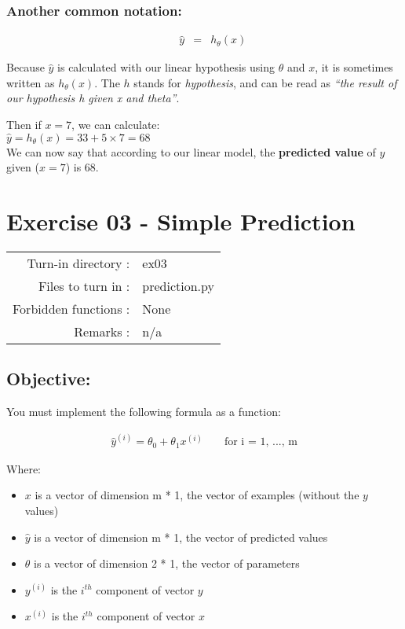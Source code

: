 \documentclass[]{article}
\begin{document}
\hypertarget{another-common-notation}{%
\subsubsection{Another common notation:}\label{another-common-notation}}

\large

\[
\begin{matrix} & & \hat{y} & = & h_{\theta}(x)\end{matrix}
\] \normalsize

Because \(\hat{y}\) is calculated with our linear hypothesis using
\(\theta\) and \(x\), it is sometimes written as \(h_{\theta}(x)\). The
\(h\) stands for \emph{hypothesis}, and can be read as \emph{``the
result of our hypothesis h given x and theta''}.

Then if \(x = 7\), we can calculate:\\
\(\hat{y} = h_{\theta}(x) = 33 + 5 \times 7 = 68\)\\
We can now say that according to our linear model, the \textbf{predicted
value} of \(y\) given (\(x = 7\)) is 68. \clearpage

\hypertarget{exercise-03---simple-prediction-1}{%
\section{Exercise 03 - Simple
Prediction}\label{exercise-03---simple-prediction-1}}

\begin{longtable}[]{@{}rl@{}}
\toprule
\endhead
Turn-in directory : & ex03\tabularnewline
Files to turn in : & prediction.py\tabularnewline
Forbidden functions : & None\tabularnewline
Remarks : & n/a\tabularnewline
\bottomrule
\end{longtable}

\hypertarget{objective}{%
\subsection{Objective:}\label{objective}}

You must implement the following formula as a function:

\large

\[
\begin{matrix}
\hat{y}^{(i)} = \theta_0 + \theta_1 x^{(i)} & &\text{ for i = 1, ..., m}
\end{matrix}
\] \normalsize

Where:

\begin{itemize}
\item
  \(x\) is a vector of dimension m * 1, the vector of examples (without
  the \(y\) values)
\item
  \(\hat{y}\) is a vector of dimension m * 1, the vector of predicted
  values
\item
  \(\theta\) is a vector of dimension 2 * 1, the vector of parameters
\item
  \(y^{(i)}\) is the \(i^{th}\) component of vector \(y\)
\item
  \(x^{(i)}\) is the \(i^{th}\) component of vector \(x\)
\end{itemize}
\end{document}
